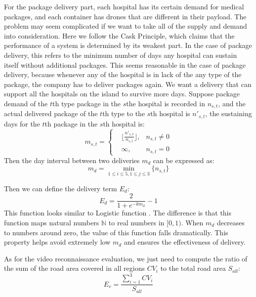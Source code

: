 \documentclass{mcmthesis}
\begin{document}
For the package delivery part, each hospital has its certain demand for medical packages, and each container has drones that are different in their payload. The problem may seem complicated if we want to take all of the supply and demand into consideration. Here we follow the Cask Principle, which claims that the performance of a system is determined by its weakest part. In the case of package delivery, this refers to the minimum number of days any hospital can sustain itself without additional packages. This seems reasonable in the case of package delivery, because whenever any of the hospital is in lack of the any type of the package, the company has to deliver packages again. We want a delivery that can support all the hospitals on the island to survive more days. Suppose package demand of the $t$th type package in the $s$the hospital is recorded in $n_{s,t}$, and the actual delivered package of the $t$th type to the $s$th hospital is $n'_{s,t}$, the sustaining days for the $t$th package in the $s$th hospital is:
\begin{equation}
    m_{s,t} = \left\{
    \begin{aligned}
    &\biggl\lfloor\frac{n'_{s,t}}{n_{s,t}}\biggr\rfloor, &n_{s,t}\neq 0 \\
    &\infty, &n_{s,t}=0
    \end{aligned}
    \right.
\end{equation}
Then the day interval between two deliveries $m_d$ can be expressed as:
\begin{equation}
    m_d = \min\limits_{1\leq i\leq 5, 1\leq j\leq 3}\{n_{s,t}\}
\end{equation}

Then we can define the delivery term $E_d$:
\begin{equation}
    E_d = \frac{2}{1+e^{-km_d}}-1
    \label{Equ:dlev}
\end{equation}
This function looks similar to Logistic function \cite{LogisticFunction}. The difference is that this function maps natural numbers $\mathbb{N}$ to real numbers in $[0,1)$. When $m_d$ decreases to numbers around zero, the value of this function falls dramatically. This property helps avoid extremely low $m_d$ and ensures the effectiveness of delivery. 

As for the video reconnaissance evaluation, we just need to compute the ratio of the sum of the road area covered in all regions $CV_i$ to the total road area $S_{all}$:
\begin{equation}
    E_v = \frac{\sum_{i=1}^3 CV_i}{S_{all}}
    \label{Equ:vrev}
\end{equation}
\end{document}
